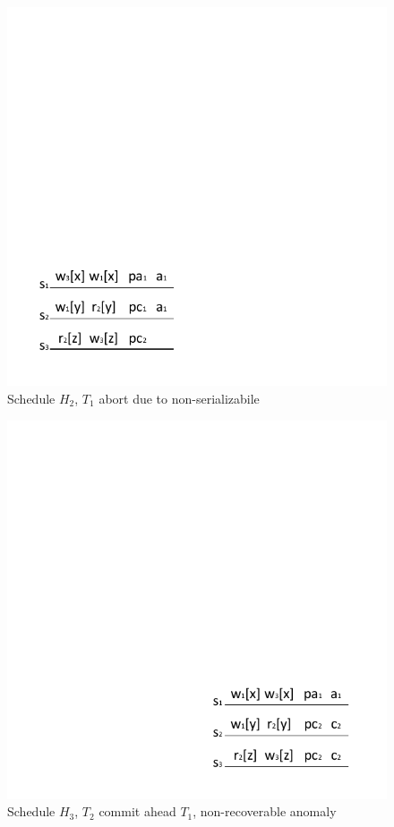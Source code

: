 \documentclass[conference]{IEEEtran}
\begin{document}
\begin{figure}[tbp]
  \centerline{\includegraphics[scale=1]{figure/schedule_not_serializabile.pdf}}
  \caption{Schedule ${H_2}$, ${T_1}$ abort due to non-serializabile}
  \label{fig:schedule_abort_example}
\end{figure}

\begin{figure}[tbp]
  \centerline{\includegraphics[scale=1]{figure/schedule_not_recoverable.pdf}}
  \caption{Schedule ${H_3}$, ${T_2}$ commit ahead ${T_1}$, non-recoverable anomaly}
  \label{fig:schedule_not_recoverable}
\end{figure}
\end{document}
